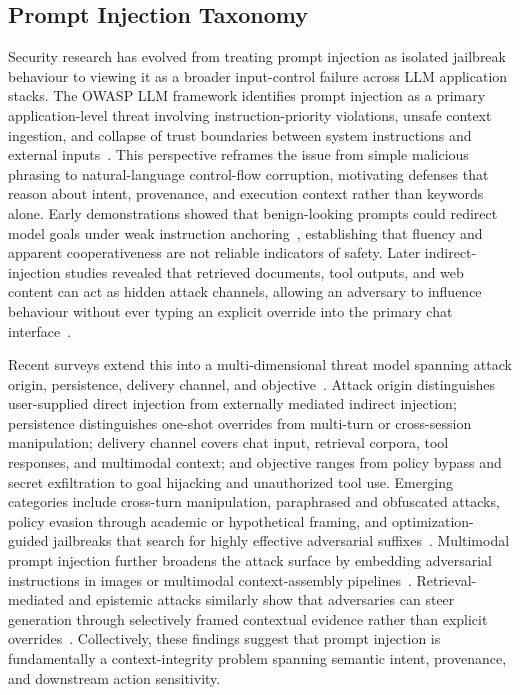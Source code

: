 ﻿\documentclass[10pt]{article}
\begin{document}
\subsection{Prompt Injection Taxonomy}
\label{sec:rw-taxonomy}

Security research has evolved from treating prompt injection as isolated jailbreak behaviour to viewing it as a broader input-control failure across LLM application stacks.
The OWASP LLM framework identifies prompt injection as a primary application-level threat involving instruction-priority violations, unsafe context ingestion, and collapse of trust boundaries between system instructions and external inputs~\cite{owasp_llm}.
This perspective reframes the issue from simple malicious phrasing to natural-language control-flow corruption, motivating defenses that reason about intent, provenance, and execution context rather than keywords alone.
Early demonstrations showed that benign-looking prompts could redirect model goals under weak instruction anchoring~\cite{perez2022ignore}, establishing that fluency and apparent cooperativeness are not reliable indicators of safety.
Later indirect-injection studies revealed that retrieved documents, tool outputs, and web content can act as hidden attack channels, allowing an adversary to influence behaviour without ever typing an explicit override into the primary chat interface~\cite{greshake2023indirect}.

Recent surveys extend this into a multi-dimensional threat model spanning attack origin, persistence, delivery channel, and objective~\cite{11359704,correia2026systematic,yi2024jailbreak}.
Attack origin distinguishes user-supplied direct injection from externally mediated indirect injection; persistence distinguishes one-shot overrides from multi-turn or cross-session manipulation; delivery channel covers chat input, retrieval corpora, tool responses, and multimodal context; and objective ranges from policy bypass and secret exfiltration to goal hijacking and unauthorized tool use.
Emerging categories include cross-turn manipulation, paraphrased and obfuscated attacks, policy evasion through academic or hypothetical framing, and optimization-guided jailbreaks that search for highly effective adversarial suffixes~\cite{yi2024jailbreak}.
Multimodal prompt injection further broadens the attack surface by embedding adversarial instructions in images or multimodal context-assembly pipelines~\cite{yeo2025multimodal}.
Retrieval-mediated and epistemic attacks similarly show that adversaries can steer generation through selectively framed contextual evidence rather than explicit overrides~\cite{wu2025epistemic,greshake2023indirect}.
Collectively, these findings suggest that prompt injection is fundamentally a context-integrity problem spanning semantic intent, provenance, and downstream action sensitivity.
\end{document}
